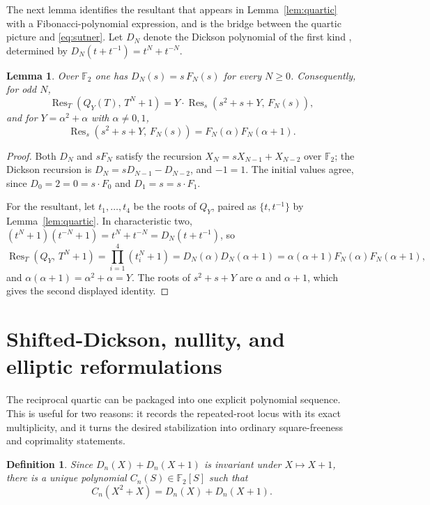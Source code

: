 \documentclass[a4paper]{article}
\newtheorem{lemma}[theorem]{Lemma}
\newtheorem{definition}[theorem]{Definition}
\newcommand{\F}{\mathbb{F}}
\DeclareMathOperator{\Res}{Res}
\begin{document}
The next lemma identifies the resultant that appears in
Lemma~\ref{lem:quartic} with a Fibonacci-polynomial expression, and is the
bridge between the quartic picture and \eqref{eq:sutner}.
Let $D_N$ denote the Dickson polynomial of the first kind
\cite[Ch.~7]{lidl-niederreiter}, determined by
$D_N(t+t^{-1})=t^{N}+t^{-N}$.

\begin{lemma}\label{lem:dickson}
	Over $\F_2$ one has $D_N(s)=s\,F_N(s)$ for every $N\geq0$.
	Consequently, for odd $N$,
	\[
		\Res_T\!\left(Q_Y(T),\,T^{N}+1\right)
		=
		Y\cdot\Res_s\!\left(s^2+s+Y,\,F_N(s)\right),
	\]
	and for $Y=\alpha^2+\alpha$ with $\alpha\ne0,1$,
	\[
		\Res_s\!\left(s^2+s+Y,\,F_N(s)\right)=F_N(\alpha)F_N(\alpha+1).
	\]
\end{lemma}

\begin{proof}
	Both $D_N$ and $sF_N$ satisfy the recursion $X_N=sX_{N-1}+X_{N-2}$ over
	$\F_2$; the Dickson recursion is $D_N=sD_{N-1}-D_{N-2}$, and $-1=1$.
	The initial values agree, since $D_0=2=0=s\cdot F_0$ and
	$D_1=s=s\cdot F_1$.

	For the resultant, let $t_1,\ldots,t_4$ be the roots of $Q_Y$, paired
	as $\{t,t^{-1}\}$ by Lemma~\ref{lem:quartic}.
	In characteristic two,
	$(t^{N}+1)(t^{-N}+1)=t^{N}+t^{-N}=D_N(t+t^{-1})$, so
	\[
		\Res_T\!\left(Q_Y,\,T^{N}+1\right)
		=\prod_{i=1}^{4}\left(t_i^{N}+1\right)
		=D_N(\alpha)D_N(\alpha+1)
		=\alpha(\alpha+1)F_N(\alpha)F_N(\alpha+1),
	\]
	and $\alpha(\alpha+1)=\alpha^2+\alpha=Y$.
	The roots of $s^2+s+Y$ are $\alpha$ and $\alpha+1$, which gives the
	second displayed identity.
\end{proof}

\section{Shifted-Dickson, nullity, and elliptic reformulations}
\label{sec:reformulations}

The reciprocal quartic can be packaged into one explicit polynomial
sequence.  This is useful for two reasons: it records the repeated-root
locus with its exact multiplicity, and it turns the desired stabilization
into ordinary square-freeness and coprimality statements.

\begin{definition}\label{def:Cn}
	Since $D_n(X)+D_n(X+1)$ is invariant under $X\mapsto X+1$, there is a
	unique polynomial $C_n(S)\in\F_2[S]$ such that
	\begin{equation}\label{eq:Cn-def}
		C_n(X^2+X)=D_n(X)+D_n(X+1).
	\end{equation}
\end{definition}
\end{document}
